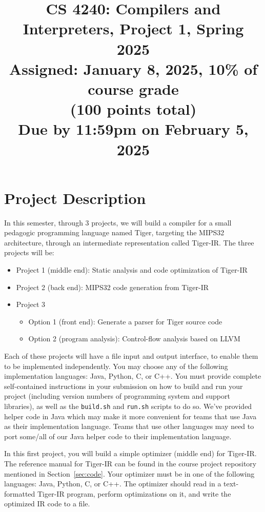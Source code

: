 \documentclass[12pt]{article}
\title{CS 4240: Compilers and Interpreters, Project 1, Spring 2025\\
\Large
Assigned: January 8, 2025, 10\% of course grade\\
(100 points total)\\
Due by 11:59pm on February 5, 2025
}
\author{}
\date{}
\begin{document}
\maketitle
\thispagestyle{fancy}

\section{Project Description}

In this semester, through 3 projects, we will build a compiler for a
small pedagogic programming language named Tiger,
targeting the MIPS32 architecture,
through an intermediate representation called Tiger-IR.
The three projects will be:
\begin{itemize}
\item Project 1 (middle end): Static analysis and code optimization of Tiger-IR
\item Project 2 (back end): MIPS32 code generation from Tiger-IR
\item Project 3
\begin{itemize}
  \item Option 1 (front end): Generate a parser for Tiger source code
\item Option 2 (program analysis): Control-flow analysis based on LLVM
  \end{itemize}
\end{itemize}
Each of these projects will have a file input and output interface, to
enable them to be implemented independently.  You may choose any
of the following implementation languages: Java, Python, C, or C++. You must provide complete
self-contained instructions in your submission on how to build and run
your project (including version numbers of programming system and
support libraries), as well as the \texttt{build.sh} and \texttt{run.sh} scripts to do so.  We've provided helper code in Java which may make
it more convenient for teams that use Java as their implementation
language.  Teams that use other languages may need to port some/all of
our Java helper code to their implementation language.

In this first project, you will build a simple optimizer (middle end) for Tiger-IR. 
The reference manual for Tiger-IR can be found in the course project repository
mentioned in Section~\ref{sec:code}.
Your optimizer must be in one of the following languages: Java, Python, C, or C++. The optimizer should read in a text-formatted Tiger-IR program, perform optimizations on it,
and write the optimized IR code to a file.
\end{document}
